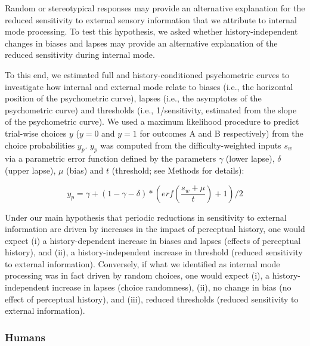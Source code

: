 \documentclass[
]{article}
\begin{document}
Random or stereotypical responses may provide an alternative explanation
for the reduced sensitivity to external sensory information that we
attribute to internal mode processing. To test this hypothesis, we asked
whether history-independent changes in biases and lapses may provide an
alternative explanation of the reduced sensitivity during internal mode.

To this end, we estimated full and history-conditioned psychometric
curves to investigate how internal and external mode relate to biases
(i.e., the horizontal position of the psychometric curve), lapses (i.e.,
the asymptotes of the psychometric curve) and thresholds (i.e.,
1/sensitivity, estimated from the slope of the psychometric curve). We
used a maximum likelihood procedure to predict trial-wise choices \(y\)
(\(y = 0\) and \(y = 1\) for outcomes A and B respectively) from the
choice probabilities \(y_p\). \(y_p\) was computed from the
difficulty-weighted inputs \(s_w\) via a parametric error function
defined by the parameters \(\gamma\) (lower lapse), \(\delta\) (upper
lapse), \(\mu\) (bias) and \(t\) (threshold; see Methods for details):

\begin{equation}
y_p = \gamma + (1 - \gamma - \delta) *  (erf(\frac{s_w + \mu}{t}) + 1) / 2
\end{equation}

Under our main hypothesis that periodic reductions in sensitivity to
external information are driven by increases in the impact of perceptual
history, one would expect (i) a history-dependent increase in biases and
lapses (effects of perceptual history), and (ii), a history-independent
increase in threshold (reduced sensitivity to external information).
Conversely, if what we identified as internal mode processing was in
fact driven by random choices, one would expect (i), a
history-independent increase in lapses (choice randomness), (ii), no
change in bias (no effect of perceptual history), and (iii), reduced
thresholds (reduced sensitivity to external information).

\hypertarget{humans}{%
\subsubsection{Humans}\label{humans}}
\end{document}
